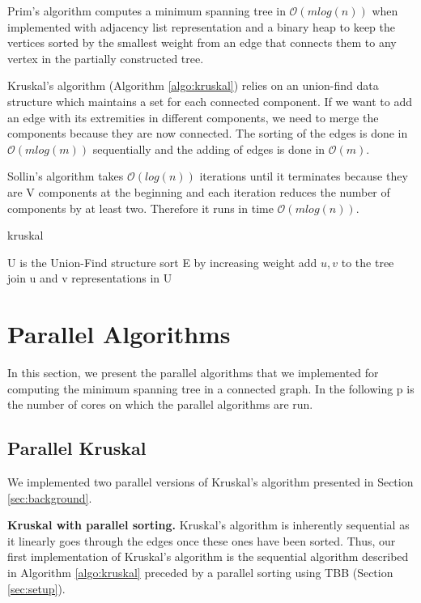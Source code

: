 \documentclass[letterpaper]{article}
\newcommand{\mypar}[1]{{\bf #1.}}
\begin{document}
Prim's algorithm computes a minimum spanning tree in $\mathcal{O}(mlog(n))$ when implemented with adjacency list representation and a binary heap to keep the vertices sorted by the smallest weight from an edge that connects them to any vertex in the partially constructed tree.

Kruskal's algorithm (Algorithm \ref{algo:kruskal}) relies on an union-find data structure which maintains a set for each connected component. If we want to add an edge with its extremities in different components, we need to merge the components because they are now connected. The sorting of the edges is done in $\mathcal{O}(mlog(m))$ sequentially and the adding of edges is done in $\mathcal{O}(m)$.

Sollin's algorithm takes $\mathcal{O}(log(n))$ iterations until it terminates because they are V components at the beginning and each iteration reduces the number of components by at least two. Therefore it runs in time $\mathcal{O}(mlog(n))$.

\begin{algorithm}
\caption{kruskal}
\label{algo:kruskal}
\begin{algorithmic}
\State U is the Union-Find structure
\State sort E by increasing weight
        \State add ${u,v}$ to the tree
        \State join u and v representations in U
    \EndIf
\EndFor

\end{algorithmic}
\end{algorithm}


\section{Parallel Algorithms}\label{sec:algo}

In this section, we present the parallel algorithms that we implemented for computing the minimum spanning tree in a connected graph.
In the following p is the number of cores on which the parallel algorithms are run.

\subsection{Parallel Kruskal} \label{sec:parKruskal}

We implemented two parallel versions of Kruskal's algorithm presented in Section \ref{sec:background}.

\mypar{Kruskal with parallel sorting} Kruskal's algorithm is inherently sequential as it linearly goes through the edges once these ones have been sorted. Thus, our first implementation of Kruskal's algorithm is the sequential algorithm described in Algorithm \ref{algo:kruskal} preceded by a parallel sorting using TBB (Section \ref{sec:setup}).
\end{document}

